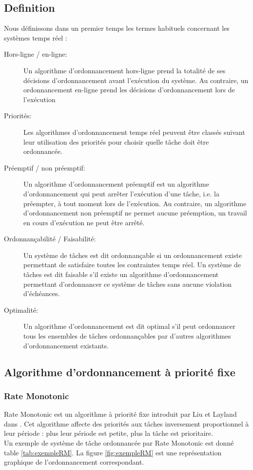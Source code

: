 \subsection*{Definition}
\vspace{-1cm}
Nous définissons dans un premier temps les termes habituels concernant les systèmes temps réel : \\
\begin{description}
\item[Hors-ligne / en-ligne:] Un algorithme d’ordonnancement hors-ligne prend la totalité de ses décisions d’ordonnancement avant l’exécution du système. Au contraire, un ordonnancement en-ligne prend les décisions d’ordonnancement lors de l’exécution 
\item[Priorités:] Les algorithmes d’ordonnancement temps réel peuvent être classés suivant leur utilisation des priorités pour choisir quelle tâche doit être ordonnancée.
\item[Préemptif / non préemptif:] Un algorithme d’ordonnancement préemptif est un algorithme d’ordonnancement qui peut arrêter l’exécution d’une tâche, i.e. la préempter, à tout moment lors de l’exécution. Au contraire, un algorithme d’ordonnancement non préemptif ne permet aucune préemption, un travail en cours d’exécution ne peut être arrêté.
\item[Ordonnançabilité / Faisabilité:] Un système de tâches est dit ordonnançable si un ordonnancement existe permettant de satisfaire toutes les contraintes temps réel. Un système de tâches est dit faisable s’il existe un algorithme d’ordonnancement permettant d’ordonnancer ce système de tâches sans aucune violation d’échéances.
\item[Optimalité:] Un algorithme d’ordonnancement est dit optimal s’il peut ordonnancer tous les ensembles de tâches ordonnançables par d’autres algorithmes d’ordonnancement existants.
\end{description}
\subsection{Algorithme d’ordonnancement à priorité fixe}
\subsubsection{Rate Monotonic \cite{LL73}}
\vspace{-1cm}
Rate Monotonic est un algorithme à priorité fixe introduit par Liu et Layland dans \cite{LL73}. Cet algorithme affecte des priorités aux tâches inversement proportionnel à leur période : plus leur période est petite, plus la tâche est prioritaire. 
\\ \indent Un exemple de système de tâche ordonnancée par Rate Monotonic est donné table \ref{tab:exempleRM}. La figure \ref{fig:exempleRM} est une représentation graphique de l'ordonnancement correspondant.

